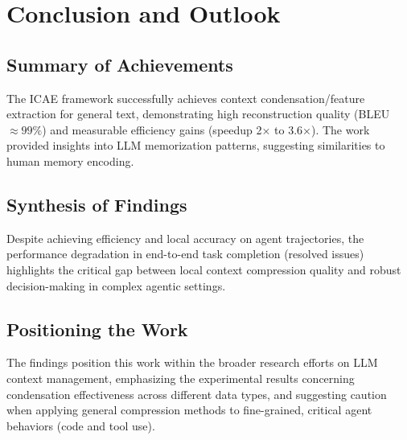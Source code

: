 \chapter{Conclusion and Outlook}


\section{Summary of Achievements}

The ICAE \cite{ge_-context_2024} framework successfully achieves context condensation/feature extraction for general text, demonstrating high reconstruction quality (BLEU $\approx 99\%$) and measurable efficiency gains (speedup 2× to 3.6×).
The work provided insights into LLM memorization patterns, suggesting similarities to human memory encoding.


\section{Synthesis of Findings}

Despite achieving efficiency and local accuracy on agent trajectories, the performance degradation in end-to-end task completion (resolved issues) highlights the critical gap between local context compression quality and robust decision-making in complex agentic settings.


\section{Positioning the Work}

The findings position this work within the broader research efforts on LLM context management, emphasizing the experimental results concerning condensation effectiveness across different data types, and suggesting caution when applying general compression methods to fine-grained, critical agent behaviors (code and tool use).
